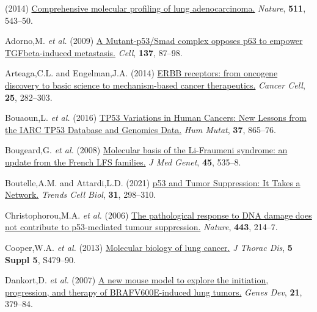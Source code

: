 \hypertarget{refs}{}
\begin{CSLReferences}{1}{0}
\leavevmode{}%
(2014) \href{https://doi.org/10.1038/nature13385}{Comprehensive molecular profiling of lung adenocarcinoma.} \emph{Nature}, \textbf{511}, 543--50.

\leavevmode{}%
Adorno,M. \emph{et al.} (2009) \href{https://doi.org/10.1016/j.cell.2009.01.039}{A Mutant-p53/Smad complex opposes p63 to empower TGFbeta-induced metastasis.} \emph{Cell}, \textbf{137}, 87--98.

\leavevmode{}%
Arteaga,C.L. and Engelman,J.A. (2014) \href{https://doi.org/10.1016/j.ccr.2014.02.025}{ERBB receptors: from oncogene discovery to basic science to mechanism-based cancer therapeutics.} \emph{Cancer Cell}, \textbf{25}, 282--303.

\leavevmode{}%
Bouaoun,L. \emph{et al.} (2016) \href{https://doi.org/10.1002/humu.23035}{TP53 Variations in Human Cancers: New Lessons from the IARC TP53 Database and Genomics Data.} \emph{Hum Mutat}, \textbf{37}, 865--76.

\leavevmode{}%
Bougeard,G. \emph{et al.} (2008) \href{https://doi.org/10.1136/jmg.2008.057570}{Molecular basis of the Li-Fraumeni syndrome: an update from the French LFS families.} \emph{J Med Genet}, \textbf{45}, 535--8.

\leavevmode{}%
Boutelle,A.M. and Attardi,L.D. (2021) \href{https://doi.org/10.1016/j.tcb.2020.12.011}{p53 and Tumor Suppression: It Takes a Network.} \emph{Trends Cell Biol}, \textbf{31}, 298--310.

\leavevmode{}%
Christophorou,M.A. \emph{et al.} (2006) \href{https://doi.org/10.1038/nature05077}{The pathological response to DNA damage does not contribute to p53-mediated tumour suppression.} \emph{Nature}, \textbf{443}, 214--7.

\leavevmode{}%
Cooper,W.A. \emph{et al.} (2013) \href{https://doi.org/10.3978/j.issn.2072-1439.2013.08.03}{Molecular biology of lung cancer.} \emph{J Thorac Dis}, \textbf{5 Suppl 5}, S479--90.

\leavevmode{}%
Dankort,D. \emph{et al.} (2007) \href{https://doi.org/10.1101/gad.1516407}{A new mouse model to explore the initiation, progression, and therapy of BRAFV600E-induced lung tumors.} \emph{Genes Dev}, \textbf{21}, 379--84.


\end{CSLReferences}
